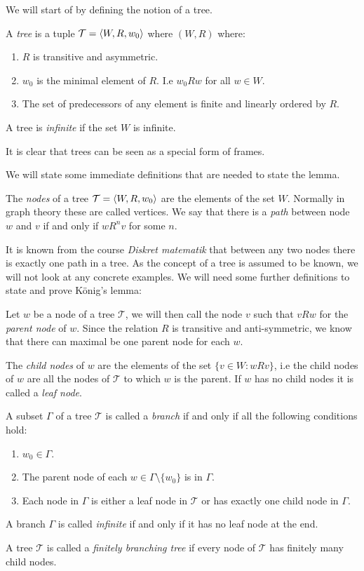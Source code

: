 \documentclass[../main.tex]{subfiles}
\begin{document}
We
will start of by defining the notion of a tree.
\begin{defi}
	A \textit{tree} is a tuple $\mathcal{T}=\langle W,R,w_0\rangle$ where $(W,R)$ where:
	\begin{enumerate}
		\item $R$ is transitive and asymmetric.
		\item $w_0$ is the minimal element of $R$. I.e $w_0
			Rw$ for all $w\in W$.
		\item The set of predecessors of any element is finite and
			linearly ordered by $R$.
	\end{enumerate}
	A tree is \textit{infinite} if the set $W$ is infinite.
\end{defi}

It is clear that trees can be seen as a special form of frames.

We will state some immediate definitions that are needed to state the lemma.
\begin{defi}
	The \textit{nodes} of a tree $\mathcal{T}=\langle W,R,w_0\rangle$ are the
	elements of the set $W$. Normally in graph theory these are called
	vertices.
	We say that there is a \textit{path} between node $w$ and $v$ if and only if
	$wR^{n}v$ for some $n$.

\end{defi}


It is known from the course \textit{Diskret matematik} that between any two
nodes there is exactly one path in a tree. 
As the concept of a tree is assumed to be known, we will not look at any concrete
examples.
We will need
some further definitions to state and prove König's lemma:
\begin{defi}
	Let $w$ be a node of a tree $\mathcal{T}$, we will then call the node
	$v$ such that $vRw$ for the \textit{parent node} of $w$. Since the
	relation $R$ is transitive and anti-symmetric, we know that there can
	maximal be one parent node for each $w$.

	The \textit{child nodes} of $w$ are the elements of the set
	$\{v\in W:wRv\}$, i.e the child nodes of $w$ are all the
	nodes of $\mathcal{T}$ to which $w$ is the parent. If $w$ has no child
	nodes it is called a \textit{leaf node}.
\end{defi}
\begin{defi}
	A subset $\Gamma$ of a tree $\mathcal{T}$ is called a
	\textit{branch} if and only if all the following conditions hold:
	\begin{enumerate}
		\item $w_0\in\Gamma$.
		\item The parent node of each $w\in\Gamma\setminus\{w_0\}$ is
			in $\Gamma$.
		\item Each node in $\Gamma$ is either a leaf node in
			$\mathcal{T}$ or has exactly one child node in
			$\Gamma$.
	\end{enumerate}
	A branch $\Gamma$ is called \textit{infinite} if and only if it has no
	leaf node at the end.
\end{defi}
\begin{defi}
	A tree $\mathcal{T}$ is called a \textit{finitely branching tree} if
	every node of $\mathcal{T}$ has finitely many child nodes.
\end{defi}
\end{document}
